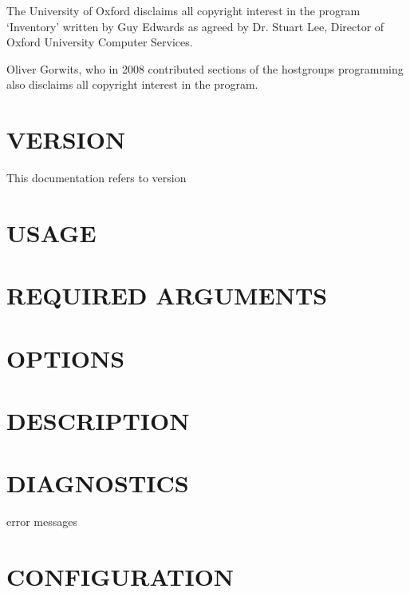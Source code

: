 \documentclass{book}
\begin{document}
The University of Oxford disclaims all copyright interest in the program `Inventory' written by Guy Edwards as agreed by Dr. Stuart Lee, Director of Oxford University Computer Services.



Oliver Gorwits, who in 2008 contributed sections of the hostgroups programming also disclaims all copyright interest in the program.




\section{VERSION}
\label{_VERSION}
\hypertarget{_VERSION}{}



This documentation refers to version


\section{USAGE}
\label{_USAGE}
\hypertarget{_USAGE}{}


\section{REQUIRED ARGUMENTS}
\label{_REQUIRED_ARGUMENTS}
\hypertarget{_REQUIRED_ARGUMENTS}{}


\section{OPTIONS}
\label{_OPTIONS}
\hypertarget{_OPTIONS}{}


\section{DESCRIPTION}
\label{_DESCRIPTION}
\hypertarget{_DESCRIPTION}{}


\section{DIAGNOSTICS}
\label{_DIAGNOSTICS}
\hypertarget{_DIAGNOSTICS}{}



error messages


\section{CONFIGURATION}
\label{_CONFIGURATION}
\hypertarget{_CONFIGURATION}{}
\end{document}
